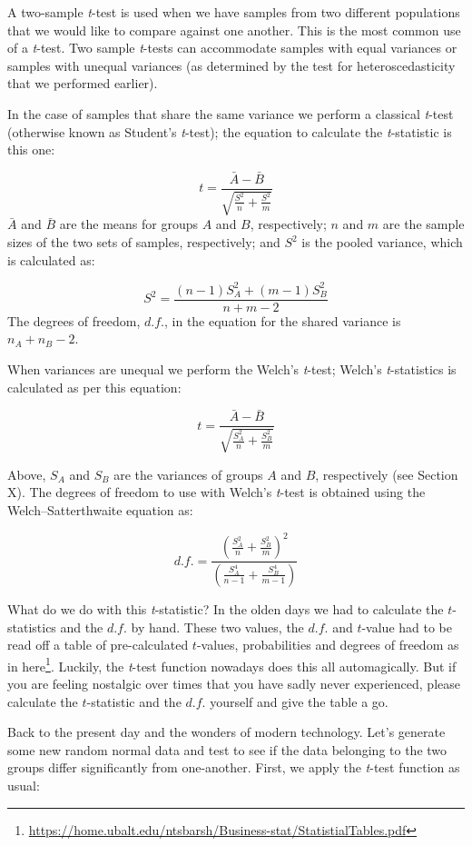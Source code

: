 \documentclass[english,10pt,a4paper,oneside]{book}
\renewcommand{\href}[2]{#2\footnote{\url{#1}}}
\let\rmarkdownfootnote\footnote%
\def\footnote{\protect\rmarkdownfootnote}
\theoremstyle{definition}
\theoremstyle{definition}
\theoremstyle{definition}
\theoremstyle{remark}
\begin{document}
A two-sample \emph{t}-test is used when we have samples from two
different populations that we would like to compare against one another.
This is the most common use of a \emph{t}-test. Two sample
\emph{t}-tests can accommodate samples with equal variances or samples
with unequal variances (as determined by the test for heteroscedasticity
that we performed earlier).

In the case of samples that share the same variance we perform a
classical \emph{t}-test (otherwise known as Student's \emph{t}-test);
the equation to calculate the \emph{t}-statistic is this one:

\[t=\frac{\bar{A}-\bar{B}}{\sqrt{\frac{S^{2}}{n}+\frac{S^{2}}{m}}}\]
\(\bar{A}\) and \(\bar{B}\) are the means for groups \(A\) and \(B\),
respectively; \(n\) and \(m\) are the sample sizes of the two sets of
samples, respectively; and \(S^{2}\) is the pooled variance, which is
calculated as:

\[S^{2}=\frac{(n-1)S_{A}^{2}+(m-1)S_{B}^{2} }{n+m-2}\] The degrees of
freedom, \(d.f.\), in the equation for the shared variance is
\(n_{A}+n_{B}-2\).

When variances are unequal we perform the Welch's \emph{t}-test; Welch's
\emph{t}-statistics is calculated as per this equation:

\[t=\frac{\bar{A}-\bar{B}}{\sqrt{\frac{S^{2}_{A}}{n}+\frac{S^{2}_{B}}{m}}}\]

Above, \(S_{A}\) and \(S_{B}\) are the variances of groups \(A\) and
\(B\), respectively (see Section X). The degrees of freedom to use with
Welch's \emph{t}-test is obtained using the Welch--Satterthwaite
equation as:

\[d.f. = \frac{\left( \frac{S^{2}_{A}}{n}+\frac{S^{2}_{B}}{m} \right)^{2}}{\left( \frac{S^{4}_{A}}{n-1} + \frac{S^{4}_{B}}{m-1} \right)}\]

What do we do with this \emph{t}-statistic? In the olden days we had to
calculate the \(t\)-statistics and the \(d.f.\) by hand. These two
values, the \(d.f.\) and \(t\)-value had to be read off a table of
pre-calculated \(t\)-values, probabilities and degrees of freedom
\href{https://home.ubalt.edu/ntsbarsh/Business-stat/StatistialTables.pdf}{as
in here}. Luckily, the \emph{t}-test function nowadays does this all
automagically. But if you are feeling nostalgic over times that you have
sadly never experienced, please calculate the \(t\)-statistic and the
\(d.f.\) yourself and give the table a go.

Back to the present day and the wonders of modern technology. Let's
generate some new random normal data and test to see if the data
belonging to the two groups differ significantly from one-another.
First, we apply the \emph{t}-test function as usual:
\end{document}
